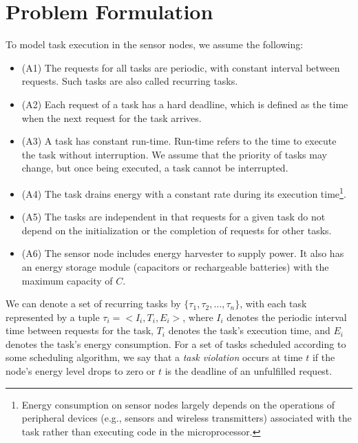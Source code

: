 \section{ Problem Formulation} \label{sec:problem}

To model task execution in the sensor nodes, we assume the following: 
\begin{itemize}
	\item (A1) The requests for all tasks are periodic, with constant interval between requests. Such tasks are also called recurring tasks. 
	\item (A2) Each request of a task has a hard deadline, which is defined as the time when the next request for the task arrives. 
	\item (A3) A task has constant run-time. Run-time refers to the time to execute the task without interruption. We assume that the priority of tasks may change, but once being executed, a task cannot be interrupted. 
	\item (A4) The task drains energy with a constant rate during its execution time\footnote{Energy consumption on sensor nodes largely depends on the operations of peripheral devices (e.g., sensors and wireless transmitters) associated with the task rather than executing code in the microprocessor.}.       
	\item (A5) The tasks are independent in that requests for a given task do not depend on the initialization or the completion of requests for other tasks.
	\item (A6) The sensor node includes energy harvester to supply power. It also has an energy storage module (capacitors or rechargeable batteries) with the maximum capacity of $C$. 
\end{itemize}

 
We can denote a set of recurring tasks by $\{\tau_1, \tau_2, \ldots, \tau_n\}$, with each task represented by a tuple $\tau_i = <I_i, T_i, E_i>$, where $I_i$ denotes the periodic interval time between requests for the task, $T_i$ denotes the task's execution time, and $E_i$ denotes the task's energy consumption. For a set of tasks scheduled according to some scheduling algorithm, we say that a \textit{task violation} occurs at time $t$ if the node's energy level drops to zero or $t$ is the deadline of an unfulfilled request.  


